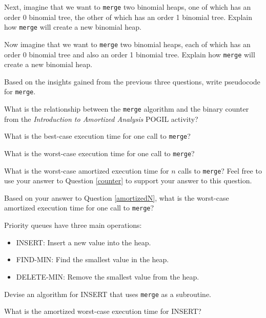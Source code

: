 \documentclass{tufte-handout}
\begin{document}
\begin{questions}
\item Next, imagine that we want to \verb|merge| two binomial heaps, one of which has an order 0 binomial tree, the other of which has an order 1 binomial tree. Explain how \verb|merge| will create a new binomial heap.

\item Now imagine that we want to \verb|merge| two binomial heaps, each of which has an order 0 binomial tree and also an order 1 binomial tree. Explain how \verb|merge| will create a new binomial heap.

\item Based on the insights gained from the previous three questions, write pseudocode for \verb|merge|.

\item What is the relationship between the \verb|merge| algorithm and the binary counter from the \emph{Introduction to Amortized Analysis} POGIL activity? \label{counter}

\item What is the best-case execution time for one call to \verb|merge|?

\item What is the worst-case execution time for one call to \verb|merge|?

\item What is the worst-case amortized execution time for $n$ calls to \verb|merge|? Feel free to use your answer to Question \ref{counter} to support your answer to this question. \label{amortizedN}

\item Based on your answer to Question \ref{amortizedN}, what is the worst-case amortized execution time for one call to \verb|merge|?

\item Priority queues have three main operations:
\begin{itemize}
    \item INSERT: Insert a new value into the heap.
    \item FIND-MIN: Find the smallest value in the heap.
    \item DELETE-MIN: Remove the smallest value from the heap.
\end{itemize}

Devise an algorithm for INSERT that uses \verb|merge| as a subroutine. 

\item What is the amortized worst-case execution time for INSERT?


\end{questions}
\end{document}
